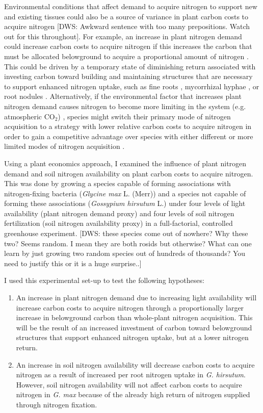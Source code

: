 Environmental conditions that affect demand to acquire nitrogen to support new and existing tissues could also be a source of variance in plant carbon costs to acquire nitrogen [DWS: Awkward sentence with too many prepositions. Watch out for this throughout].  For example, an increase in plant nitrogen demand could increase carbon costs to acquire nitrogen if this increases the carbon that must be allocated belowground to acquire a proportional amount of nitrogen . This could be driven by a temporary state of diminishing return associated with investing carbon toward building and maintaining structures that are necessary to support enhanced nitrogen uptake, such as fine roots , mycorrhizal hyphae , or root nodules . Alternatively, if the environmental factor that increases plant nitrogen demand causes nitrogen to become more limiting in the system (e.g. atmospheric CO$_2$) , species might switch their primary mode of nitrogen acquisition to a strategy with lower relative carbon costs to acquire nitrogen in order to gain a competitive advantage over species with either different or more limited modes of nitrogen acquisition .

Using a plant economics approach, I examined the influence of plant nitrogen demand and soil nitrogen availability on plant carbon costs to acquire nitrogen. This was done by growing a species capable of forming associations with nitrogen-fixing bacteria (\textit{Glycine max} L. (Merr)) and a species not capable of forming these associations (\textit{Gossypium hirsutum} L.) under four levels of light availability (plant nitrogen demand proxy) and four levels of soil nitrogen fertilization (soil nitrogen availability proxy) in a full-factorial, controlled greenhouse experiment.
[DWS: these species come out of nowhere? Why these two? Seems random. I mean they are both rosids but otherwise?  What can one learn by just growing two random species out of hundreds of thousands? You need to justify this or it is a huge surprise..] 

I used this experimental set-up to test the following hypotheses:
\begin{enumerate}
\item An increase in plant nitrogen demand due to increasing light availability will increase carbon costs to acquire nitrogen through a proportionally larger increase in belowground carbon than whole-plant nitrogen acquisition. This will be the result of an increased investment of carbon toward belowground structures that support enhanced nitrogen uptake, but at a lower nitrogen return. 

\item An increase in soil nitrogen availability will decrease carbon costs to acquire nitrogen as a result of increased per root nitrogen uptake in \textit{G. hirsutum}. However, soil nitrogen availability will not affect carbon costs to acquire nitrogen in \textit{G. max} because of the already high return of nitrogen supplied through nitrogen fixation.
\end{enumerate}

